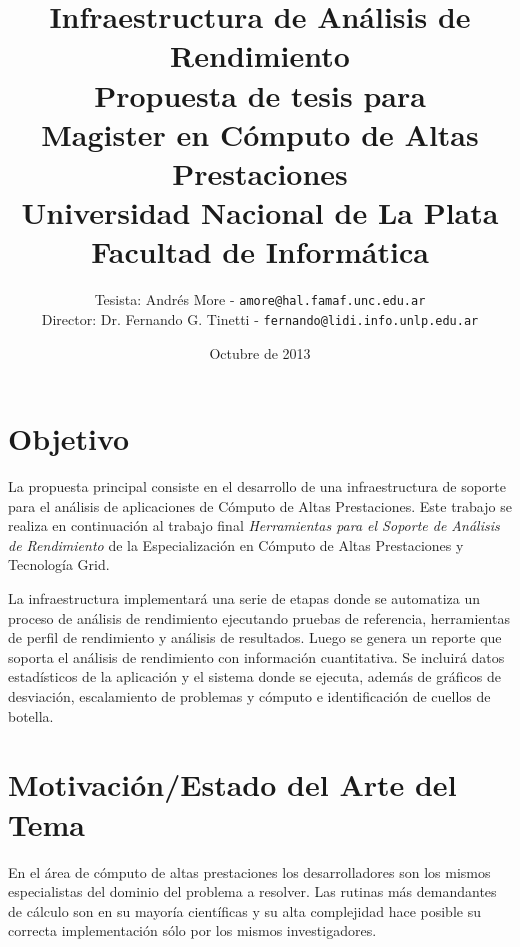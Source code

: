 \documentclass[a4paper]{article}
\begin{document}
\title{Infraestructura de Análisis de Rendimiento\\
\bigskip
{\large Propuesta de tesis para\\} Magister en Cómputo de Altas Prestaciones\\
\bigskip
Universidad Nacional de La Plata\\
Facultad de Informática\\
\bigskip
}

\author{Tesista: Andrés More - {\tt amore@hal.famaf.unc.edu.ar}\\
Director: Dr. Fernando G. Tinetti - {\tt fernando@lidi.info.unlp.edu.ar}}

\date{Octubre de 2013}

\maketitle

\newpage

\section{Objetivo}

La propuesta principal consiste en el desarrollo de una infraestructura de soporte para el análisis de aplicaciones de Cómputo de Altas Prestaciones. Este trabajo se realiza en continuación al trabajo final {\it Herramientas para el Soporte de Análisis de Rendimiento} de la Especialización en Cómputo de Altas Prestaciones y Tecnología Grid.

\bigskip

La infraestructura implementará una serie de etapas donde se automatiza un proceso de análisis de rendimiento ejecutando pruebas de referencia, herramientas de perfil de rendimiento y análisis de resultados. Luego se genera un reporte que soporta el análisis de rendimiento con información cuantitativa.
Se incluirá datos estadísticos de la aplicación y el sistema donde se ejecuta, además de gráficos de desviación, escalamiento de problemas y cómputo e identificación de cuellos de botella.

\section{Motivación/Estado del Arte del Tema}

En el área de cómputo de altas prestaciones los desarrolladores son los mismos
especialistas del dominio del problema a resolver. Las rutinas
más demandantes de cálculo son en su mayoría científicas y su
alta complejidad hace posible su correcta implementación sólo por los mismos investigadores.
\end{document}
